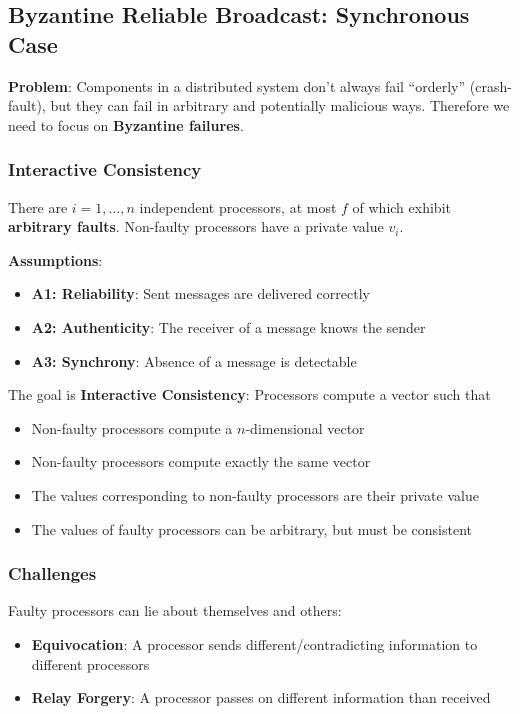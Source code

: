 \documentclass[12pt,A4]{extarticle}
\newcommand{\highlight}[1]{\textcolor{highlightColor}{\textbf{#1}}}
\begin{document}
\subsection{Byzantine Reliable Broadcast: Synchronous Case}
\textbf{Problem}: Components in a distributed system don't always fail ``orderly'' (crash-fault), but they can fail in arbitrary and potentially malicious ways. Therefore we need to focus on \highlight{Byzantine failures}.

\subsubsection{Interactive Consistency}
There are $i = 1, \dots, n$ independent processors, at most $f$ of which exhibit \textbf{arbitrary faults}. Non-faulty processors have a private value $v_i$.\par
\textbf{Assumptions}:
\begin{itemize}
  \item{\textbf{A1: Reliability}: Sent messages are delivered correctly}
  \item{\textbf{A2: Authenticity}: The receiver of a message knows the sender}
  \item{\textbf{A3: Synchrony}: Absence of a message is detectable}
\end{itemize}
The goal is \highlight{Interactive Consistency}: Processors compute a vector such that
\begin{itemize}
  \item{Non-faulty processors compute a $n$-dimensional vector}
  \item{Non-faulty processors compute exactly the same vector}
  \item{The values corresponding to non-faulty processors are their private value}
  \item{The values of faulty processors can be arbitrary, but must be consistent}
\end{itemize}

\subsubsection{Challenges}
Faulty processors can lie about themselves and others:
\begin{itemize}
  \item{\highlight{Equivocation}: A processor sends different/contradicting information to different processors}
  \item{\highlight{Relay Forgery}: A processor passes on different information than received}
\end{itemize}
\end{document}
